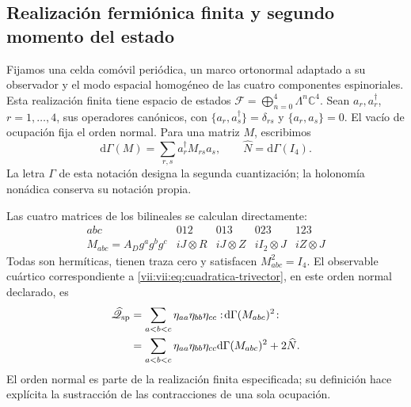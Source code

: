 \subsection{Realización fermiónica finita y segundo momento del estado}
\label{vii:vii:subsec:segundo-momento-car}

Fijamos una celda comóvil periódica, un marco ortonormal adaptado a su
observador y el modo espacial homogéneo de las cuatro componentes
espinoriales. Esta realización finita tiene espacio de estados
\(\mathcal F=\bigoplus_{n=0}^4\Lambda^n\mathbb C^4\).
Sean \(a_r,a_r^\dagger\), \(r=1,\ldots,4\), sus operadores
canónicos, con
\(\{a_r,a_s^\dagger\}=\delta_{rs}\) y
\(\{a_r,a_s\}=0\). El vacío de ocupación fija el orden
normal. Para una matriz \(M\), escribimos
\[
 \mathrm d\Gamma(M)=\sum_{r,s}a_r^\dagger M_{rs}a_s,
 \qquad \widehat N=\mathrm d\Gamma(I_4).
\]
La letra \(\Gamma\) de esta notación designa la segunda
cuantización; la holonomía nonádica conserva su notación propia.

Las cuatro matrices de los bilineales se calculan directamente:
\begin{equation}
 \begin{array}{c|cccc}
 abc&012&013&023&123\\ \hline
 M_{abc}=A_Dg^ag^bg^c
       &iJ\otimes R&iJ\otimes Z&iI_2\otimes J&iZ\otimes J
 \end{array}
 \label{vii:vii:eq:matrices-bilineales-espin}
\end{equation}
Todas son hermíticas, tienen traza cero y satisfacen
\(M_{abc}^2=I_4\). El observable cuártico correspondiente a
\eqref{vii:vii:eq:cuadratica-trivector}, en este orden normal declarado,
es
\begin{equation}
 \begin{split}
 \widehat{\mathscr Q}_{\rm sp}
 &=\sum_{a<b<c}\eta_{aa}\eta_{bb}\eta_{cc}
       :\!\mathrm d\Gamma(M_{abc})^2\!:\\
 &=\sum_{a<b<c}\eta_{aa}\eta_{bb}\eta_{cc}
       \mathrm d\Gamma(M_{abc})^2+2\widehat N.
 \end{split}
 \label{vii:vii:eq:observable-cuadratico-espin}
\end{equation}
El orden normal es parte de la realización finita especificada;
su definición hace explícita la sustracción de las contracciones de
una sola ocupación.

